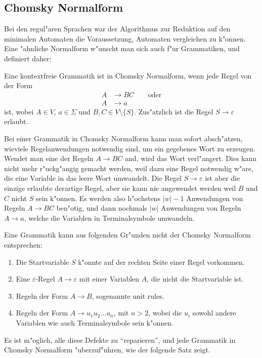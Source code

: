 \subsection{Chomsky Normalform}
Bei den regul"aren Sprachen war der Algorithmus zur Reduktion
auf den minimalen Automaten die Voraussetzung, Automaten vergleichen
zu k"onnen. Eine "ahnliche Normalform w"unscht man sich auch f"ur
Grammatiken, und definiert daher:
\begin{definition}
Eine kontextfreie Grammatik  ist in Chomsky Normalform, wenn
jede Regel von der Form
\begin{align*}
A&\to BC\qquad\text{oder}\\
A&\to a
\end{align*}
ist, wobei $A\in V$, $a\in\Sigma$ und $B, C\in V\setminus\{S\}$.
Zus"atzlich ist die Regel $S\to\varepsilon$ erlaubt. 
\end{definition}

Bei einer Grammatik in Chomsky Normalform kann man sofort absch"atzen,
wieviele Regelanwendungen notwendig sind, um ein gegebenes Wort
zu erzeugen. Wendet man eine der Regeln $A\to BC$ and, wird das
Wort verl"angert. Dies kann nicht mehr r"uckg"angig gemacht
werden, weil dazu eine Regel notwendig w"are, die eine Variable
in das leere Wort umwandelt. Die Regel $S\to\varepsilon$ ist aber
die einzige erlaubte derartige Regel, aber sie kann nie angewendet
werden weil $B$ und $C$ nicht $S$ sein k"onnen. Es werden also
h"ochstens $|w|-1$ Anwendungen von Regeln $A\to BC$ ben"otig, und dann
nochmals $|w|$ Anwendungen von Regeln $A\to a$, welche die Variablen
in Terminalsymbole umwandeln. 

Eine Grammatik kann aus folgenden Gr"unden nicht der Chomsky Normalform
entsprechen:
\begin{enumerate}
\item Die Startvariable $S$ k"onnte auf der rechten Seite einer
Regel vorkommen.
\item Eine $\varepsilon$-Regel $A\to\varepsilon$ mit einer Variablen
$A$, die nicht die Startvariable ist.
\item Regeln der Form $A\to B$, sogenannte unit rules.
\item Regeln der Form $A\to u_1u_2\dots u_n$, mit $n>2$, wobei
die $u_i$ sowohl andere Variablen wie auch Terminalsymbole sein 
k"onnen.
\end{enumerate}
Es ist m"oglich, alle diese Defekte zu ``reparieren'', und jede
Grammatik in Chomsky Normalform "uberzuf"uhren, wie der folgende Satz
zeigt.

